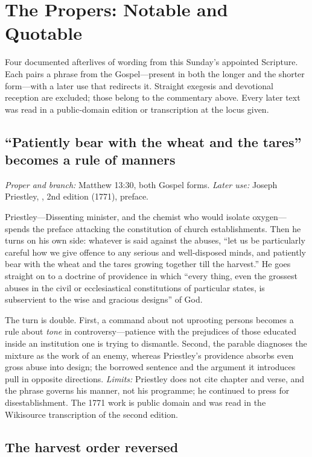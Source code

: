 \section*{The Propers: Notable and Quotable}

Four documented afterlives of wording from this Sunday's appointed Scripture.
Each pairs a phrase from the Gospel---present in both the longer and the
shorter form---with a later use that redirects it. Straight exegesis and
devotional reception are excluded; those belong to the commentary above. Every
later text was read in a public-domain edition or transcription at the locus
given.

\subsection*{``Patiently bear with the wheat and the tares'' becomes a rule of manners}

\emph{Proper and branch:} Matthew 13:30, both Gospel forms.
\emph{Later use:} Joseph Priestley, , 2nd edition (1771), preface.

Priestley---Dissenting minister, and the chemist who would isolate
oxygen---spends the preface attacking the constitution of church
establishments. Then he turns on his own side: whatever is said against the
abuses, ``let us be particularly careful how we give offence to any serious and
well-disposed minds, and patiently bear with the wheat and the tares growing
together till the harvest.'' He goes straight on to a doctrine of providence in
which ``every thing, even the grossest abuses in the civil or ecclesiastical
constitutions of particular states, is subservient to the wise and gracious
designs'' of God.

The turn is double. First, a command about not uprooting persons becomes a rule
about \emph{tone} in controversy---patience with the prejudices of those
educated inside an institution one is trying to dismantle. Second, the parable
diagnoses the mixture as the work of an enemy, whereas Priestley's providence
absorbs even gross abuse into design; the borrowed sentence and the argument it
introduces pull in opposite directions. \emph{Limits:} Priestley does not cite
chapter and verse, and the phrase governs his manner, not his programme; he
continued to press for disestablishment. The 1771 work is public domain and was
read in the Wikisource transcription of the second edition.

\subsection*{The harvest order reversed}


